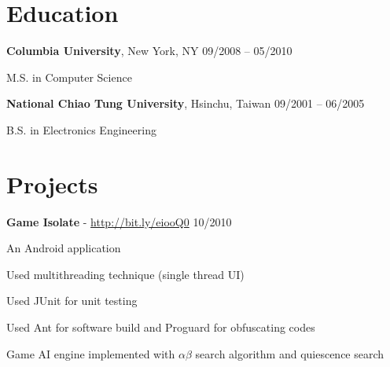 \documentclass[margin,line]{resume}
\begin{document}
\begin{resume}
    \section{\mysidestyle Education}

    \textbf{Columbia University}, New York, NY \hfill 09/2008 -- 05/2010 \vspace{-3mm}\\\vspace{-1mm}%
      \begin{list2}
       \item M.S. in Computer Science
      \end{list2}
 
    \textbf{National Chiao Tung University}, Hsinchu, Taiwan \hfill 09/2001 -- 06/2005 \vspace{-3mm}\\\vspace{-1mm}%
      \begin{list2}
       \item B.S. in Electronics Engineering
      \end{list2}

    \section{\mysidestyle Projects}

    \textbf{Game Isolate} - \url{http://bit.ly/eiooQ0} \hfill 10/2010 \vspace{-3mm}\\\vspace{-1mm}%
      \begin{list2}
       \item An Android application
       \item Used multithreading technique (single thread UI)
       \item Used JUnit for unit testing
       \item Used Ant for software build and Proguard for obfuscating codes
       \item Game AI engine implemented with $\alpha \beta$ search algorithm and quiescence search
      \end{list2}


\end{resume}
\end{document}

